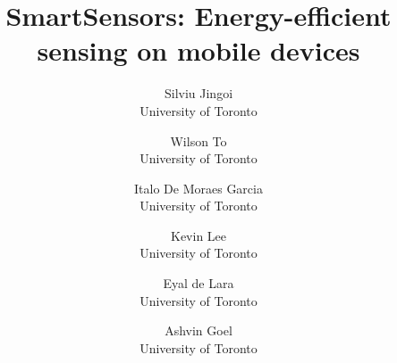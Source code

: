 \documentclass[letterpaper,twocolumn,10pt]{article}
\begin{document}
\date{}


\title{\Large \bf SmartSensors: Energy-efficient sensing on mobile devices}

\author{
{\rm Silviu Jingoi}\\
University of Toronto
\and
{\rm Wilson To}\\
University of Toronto
\and
{\rm Italo De Moraes Garcia}\\
University of Toronto
\and
{\rm Kevin Lee}\\
University of Toronto
\and
{\rm Eyal de Lara}\\
University of Toronto
\and
{\rm Ashvin Goel}\\
University of Toronto
} %

\maketitle















{\footnotesize 
}
\end{document}
